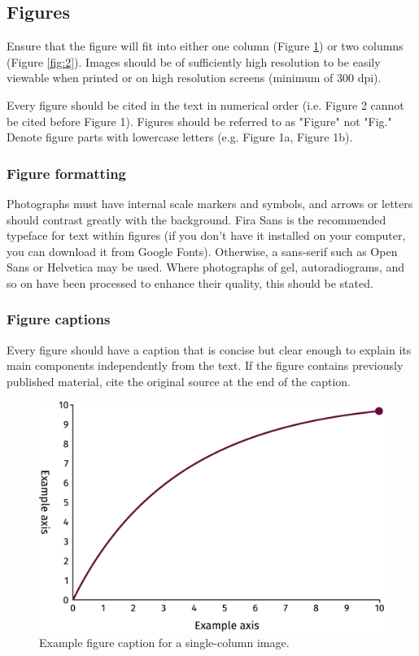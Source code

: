 \documentclass[twocolumn,twoside]{base/ajstd}
\begin{document}
\subsection{Figures}

Ensure that the figure will fit into either one column (Figure \ref{fig:1}) or two columns (Figure \ref{fig:2}). Images should be of sufficiently high resolution to be easily viewable when printed or on high resolution screens (minimum of 300 dpi).

Every figure should be cited in the text in numerical order (i.e. Figure 2 cannot be cited before Figure 1). Figures should be referred to as "Figure" not "Fig." Denote figure parts with lowercase letters (e.g. Figure 1a, Figure 1b).

\subsubsection{Figure formatting}

Photographs must have internal scale markers and symbols, and arrows or letters should contrast greatly with the background. Fira Sans is the recommended typeface for text within figures (if you don’t have it installed on your computer, you can download it from Google Fonts). Otherwise, a sans-serif such as Open Sans or Helvetica may be used. Where photographs of gel, autoradiograms, and so on have been processed to enhance their quality, this should be stated.

\subsubsection{Figure captions}

Every figure should have a caption that is concise but clear enough to explain its main components independently from the text. If the figure contains previously published material, cite the original source at the end of the caption.

\begin{figure}[!b]
	\centering
	\includegraphics[width=\linewidth]{figures/Figure1.pdf}
	\caption{Example figure caption for a single-column image.}
	\label{fig:1}
\end{figure}
\end{document}
